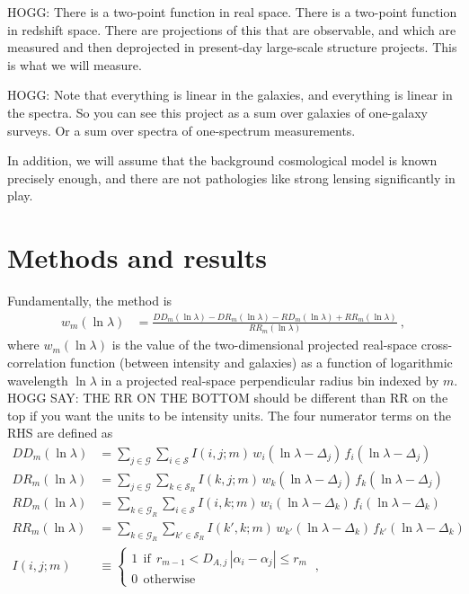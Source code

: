 \documentclass{article}
\newcommand{\set}[1]{\mathscr{#1}}
\begin{document}
HOGG: There is a two-point function in real space. There is a two-point function in redshift space. There are projections of this that are observable, and which are measured and then deprojected in present-day large-scale structure projects. This is what we will measure.

HOGG: Note that everything is linear in the galaxies, and everything is linear in the spectra. So you can see this project as a sum over galaxies of one-galaxy surveys. Or a sum over spectra of one-spectrum measurements.

In addition, we will assume that the background cosmological model is known precisely enough, and there are not pathologies like strong lensing significantly in play.

\section{Methods and results}\label{sec:method}
Fundamentally, the method is
\begin{align}
    w_m(\ln\lambda) &= \frac{DD_m(\ln\lambda) - DR_m(\ln\lambda) - RD_m(\ln\lambda) + RR_m(\ln\lambda)}{RR_m(\ln\lambda)} ~,\label{eq:ls}
\end{align}
where $w_m(\ln\lambda)$ is the value of the two-dimensional projected real-space cross-correlation function (between intensity and galaxies) as a function of logarithmic wavelength $\ln\lambda$ in a projected real-space perpendicular radius bin indexed by $m$.
HOGG SAY: THE RR ON THE BOTTOM should be different than RR on the top if you want the units to be intensity units.
The four numerator terms on the RHS are defined as
\begin{align}
    DD_m(\ln\lambda) &= 
    \sum_{j\in\set{G}}\sum_{i\in\set{S}} I(i,j;m)\,w_i(\ln\lambda-\Delta_j)\,f_i(\ln\lambda-\Delta_j) \\
    DR_m(\ln\lambda) &= 
    \sum_{j\in\set{G}}\sum_{k\in\set{S}_R} I(k,j;m)\,w_k(\ln\lambda-\Delta_j)\,f_k(\ln\lambda-\Delta_j) \\
    RD_m(\ln\lambda) &= 
    \sum_{k\in\set{G}_R}\sum_{i\in\set{S}} I(i,k;m)\,w_i(\ln\lambda-\Delta_k)\,f_i(\ln\lambda-\Delta_k) \\
    RR_m(\ln\lambda) &= 
    \sum_{k\in\set{G}_R}\sum_{k'\in\set{S}_R} I(k',k;m)\,w_{k'}(\ln\lambda-\Delta_k)\,f_{k'}(\ln\lambda-\Delta_k) \\
    I(i,j;m) &\equiv\left\{\begin{array}{l}1~~\text{if}~~r_{m-1}<D_{A,j}\,|\alpha_i-\alpha_j|\leq r_m \\ 0~~\text{otherwise}\end{array}\right.~,
\end{align}
\end{document}
